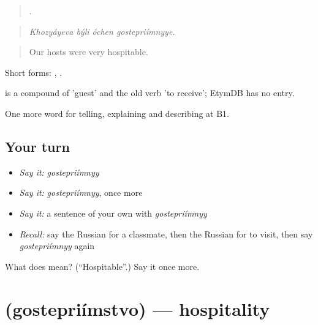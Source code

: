 \begin{quote}
   .
\end{quote}

\begin{quote}
\emph{Khozyáyeva býli óchen gostepriímnyye.}
\end{quote}

\begin{quote}
Our hosts were very hospitable.
\end{quote}

Short forms: , .

\begin{cousinweb}
\emph{} is a compound of \emph{} 'guest' and the old verb \emph{} 'to receive'; EtymDB has no entry.
\end{cousinweb}

\begin{grammarlens}[title={What you've built}]
One more word for telling, explaining and describing at B1.
\end{grammarlens}

\subsection*{Your turn}
\begin{itemize}
\raggedright
  \item \emph{Say it:} \emph{gostepriímnyy}
  \item \emph{Say it:} \emph{gostepriímnyy}, once more
  \item \emph{Say it:} a sentence of your own with \emph{gostepriímnyy}
  \item \emph{Recall:} say the Russian for a classmate, then the Russian for to visit, then say \emph{gostepriímnyy} again
\end{itemize}

\begin{tcolorbox}[breakable,colback=teal!4,colframe=teal!35!black,title={Before you move on}]
What does  mean? (\textquotedblleft{}Hospitable\textquotedblright{}.) Say it once more.
\end{tcolorbox}
\section[\texorpdfstring{\ru{гостеприимство} (gostepriímstvo)}{гостеприимство (gostepriímstvo)}]{ (gostepriímstvo) — hospitality}

